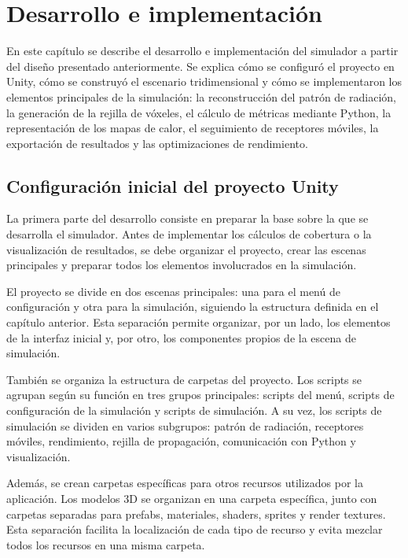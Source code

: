 \chapter{Desarrollo e implementación}
\label{chap:desarrollo}

En este capítulo se describe el desarrollo e implementación del simulador a partir del diseño presentado anteriormente. Se explica cómo se configuró el proyecto en Unity, cómo se construyó el escenario tridimensional y cómo se implementaron los elementos principales de la simulación: la reconstrucción del patrón de radiación, la generación de la rejilla de vóxeles, el cálculo de métricas mediante Python, la representación de los mapas de calor, el seguimiento de receptores móviles, la exportación de resultados y las optimizaciones de rendimiento.

\section{Configuración inicial del proyecto Unity}

La primera parte del desarrollo consiste en preparar la base sobre la que se desarrolla el simulador. Antes de implementar los cálculos de cobertura o la visualización de resultados, se debe organizar el proyecto, crear las escenas principales y preparar todos los elementos involucrados en la simulación.

El proyecto se divide en dos escenas principales: una para el menú de configuración y otra para la simulación, siguiendo la estructura definida en el capítulo anterior. Esta separación permite organizar, por un lado, los elementos de la interfaz inicial y, por otro, los componentes propios de la escena de simulación.

También se organiza la estructura de carpetas del proyecto. Los scripts se agrupan según su función en tres grupos principales: scripts del menú, scripts de configuración de la simulación y scripts de simulación. A su vez, los scripts de simulación se dividen en varios subgrupos: patrón de radiación, receptores móviles, rendimiento, rejilla de propagación, comunicación con Python y visualización.

Además, se crean carpetas específicas para otros recursos utilizados por la aplicación. Los modelos 3D se organizan en una carpeta específica, junto con carpetas separadas para prefabs, materiales, shaders, sprites y render textures. Esta separación facilita la localización de cada tipo de recurso y evita mezclar todos los recursos en una misma carpeta.

